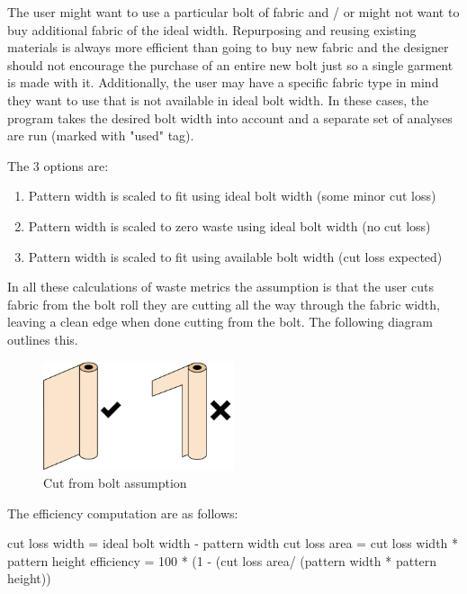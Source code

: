 The user might want to use a particular bolt of fabric and / or might not want to buy additional fabric of the ideal width. Repurposing and reusing existing materials is always more efficient than going to buy new fabric and the designer should not encourage the purchase of an entire new bolt just so a single garment is made with it. Additionally, the user may have a specific fabric type in mind they want to use that is not available in ideal bolt width. In these cases, the program takes the desired bolt width into account and a separate set of analyses are run (marked with "used" tag).

The 3 options are:
\begin{enumerate}
    \item Pattern width is scaled to fit using ideal bolt width (some minor cut loss)
    \item Pattern width is scaled to zero waste using ideal bolt width (no cut loss)
    \item Pattern width is scaled to fit using available bolt width (cut loss expected)
\end{enumerate}

In all these calculations of waste metrics the assumption is that the user cuts fabric from the bolt roll they are cutting all the way through the fabric width, leaving a clean edge when done cutting from the bolt. The following diagram outlines this.

\begin{figure} [H]
    \centering
    \includegraphics[width = 0.5\textwidth]{Images/bolt cutting.png}
    \caption{Cut from bolt assumption}
    \label{fig:cut from bolt}
\end{figure}

The efficiency computation are as follows:

cut loss width = ideal bolt width - pattern width \newline
cut loss area = cut loss width * pattern height \newline
efficiency = 100 * (1 - (cut loss area/ (pattern width * pattern height))


